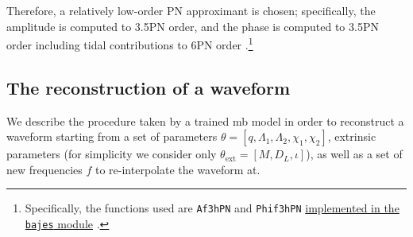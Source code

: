 \documentclass[main.tex]{subfiles}
\begin{document}
Therefore, a relatively low-order \ac{PN} approximant is chosen; specifically, the amplitude is computed to 3.5PN order, and the phase is computed to 3.5PN order including tidal contributions to 6PN order \cite{favataSystematicParameterErrors2014}.\footnote{Specifically, the functions used are \texttt{Af3hPN} and \texttt{Phif3hPN} \href{https://github.com/matteobreschi/bajes/blob/stable/v0.1/bajes/obs/gw/approx/taylorf2.py}{implemented in the \texttt{bajes} module} \cite[]{breschiTtBajesBayesian2021}.}

\subsection{The reconstruction of a waveform}

We describe the procedure taken by a trained \ac{mb} model in order to reconstruct a waveform starting from a set of parameters \(\theta = [q, \Lambda_1 , \Lambda_2 , \chi_1 , \chi_2 ]\), extrinsic parameters (for simplicity we consider only \(\theta _{\text{ext}} = [M, D_L, \iota]\)), as well as a set of new frequencies \(f\) to re-interpolate the waveform at.
\end{document}
